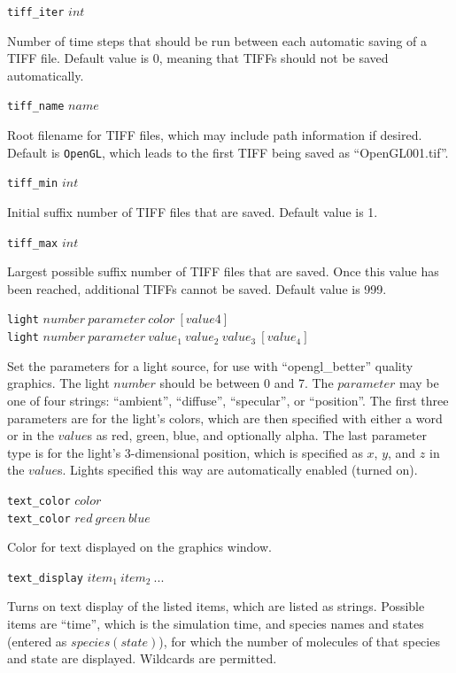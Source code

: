 \documentclass {book}
\newcommand {\ttt} {\texttt}
\begin{document}
\begin{description}
\item{\ttt{tiff\_iter} $int$}

Number of time steps that should be run between each automatic saving of a TIFF file. Default value is 0, meaning that TIFFs should not be saved automatically.

\item{\ttt{tiff\_name} $name$}

Root filename for TIFF files, which may include path information if desired. Default is \ttt{OpenGL}, which leads to the first TIFF being saved as ``OpenGL001.tif''.

\item{\ttt{tiff\_min} $int$}

Initial suffix number of TIFF files that are saved. Default value is 1.

\item{\ttt{tiff\_max} $int$}

Largest possible suffix number of TIFF files that are saved. Once this value has been reached, additional TIFFs cannot be saved. Default value is 999.

\item{\ttt{light} $number\ parameter\ color\ [value4]$\\
\ttt{light} $number\ parameter\ value_1\ value_2\ value_3\ [value_4]$}

Set the parameters for a light source, for use with ``opengl\_better'' quality graphics. The light $number$ should be between 0 and 7. The $parameter$ may be one of four strings: ``ambient'', ``diffuse'', ``specular'', or ``position''. The first three parameters are for the light's colors, which are then specified with either a word or in the $value$s as red, green, blue, and optionally alpha. The last parameter type is for the light's 3-dimensional position, which is specified as $x$, $y$, and $z$ in the $value$s. Lights specified this way are automatically enabled (turned on).

\item{\ttt{text\_color} $color$\\
\ttt{text\_color} $red\ green\ blue$}

Color for text displayed on the graphics window.

\item{\ttt{text\_display} $item_1\ item_2\ ...$}

Turns on text display of the listed items, which are listed as strings. Possible items are ``time'', which is the simulation time, and species names and states (entered as $species(state)$), for which the number of molecules of that species and state are displayed. Wildcards are permitted.

\end{description}
\end{document}
